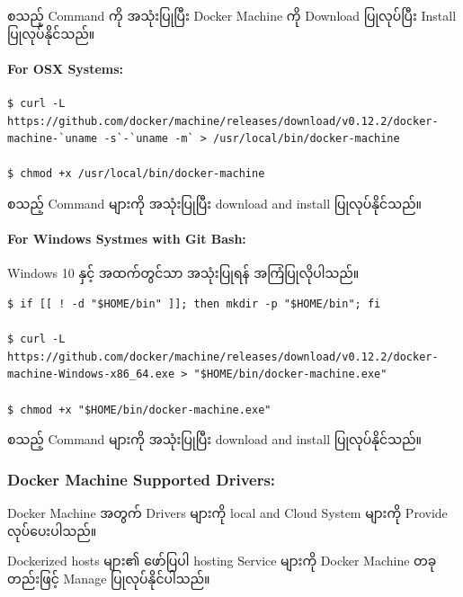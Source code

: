 \documentclass{article}
\begin{document}
စသည့် Command ကို အသုံးပြုပြီး Docker Machine ကို Download ပြုလုပ်ပြီး
Install ပြုလုပ်နိုင်သည်။

\paragraph{For OSX Systems:}\label{for-osx-systems}

\begin{verbatim}
$ curl -L https://github.com/docker/machine/releases/download/v0.12.2/docker-machine-`uname -s`-`uname -m` > /usr/local/bin/docker-machine

$ chmod +x /usr/local/bin/docker-machine
\end{verbatim}

စသည့် Command များကို အသုံးပြုပြီး download and install ပြုလုပ်နိုင်သည်။

\paragraph{For Windows Systmes with Git
Bash:}\label{for-windows-systmes-with-git-bash}

Windows 10 နှင့် အထက်တွင်သာ အသုံးပြုရန် အကြံပြုလိုပါသည်။

\begin{verbatim}
$ if [[ ! -d "$HOME/bin" ]]; then mkdir -p "$HOME/bin"; fi

$ curl -L https://github.com/docker/machine/releases/download/v0.12.2/docker-machine-Windows-x86_64.exe > "$HOME/bin/docker-machine.exe"

$ chmod +x "$HOME/bin/docker-machine.exe"
\end{verbatim}

စသည့် Command များကို အသုံးပြုပြီး download and install ပြုလုပ်နိုင်သည်။

\subsubsection{Docker Machine Supported
Drivers:}\label{docker-machine-supported-drivers}

Docker Machine အတွက် Drivers များကို local and Cloud System များကို
Provide လုပ်ပေးပါသည်။

Dockerized hosts များ၏ ဖော်ပြပါ hosting Service များကို Docker Machine
တခုတည်းဖြင့် Manage ပြုလုပ်နိုင်ပါသည်။
\end{document}
